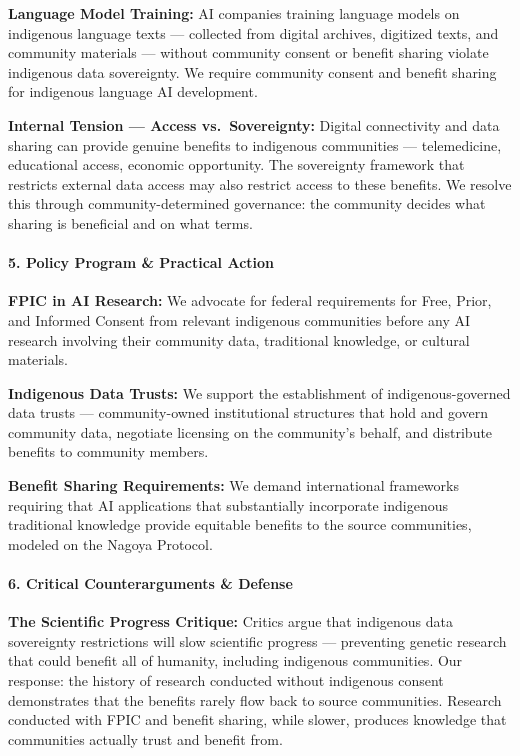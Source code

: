 \textbf{Language Model Training:} AI companies training language models
on indigenous language texts --- collected from digital archives,
digitized texts, and community materials --- without community consent
or benefit sharing violate indigenous data sovereignty. We require
community consent and benefit sharing for indigenous language AI
development.

\textbf{Internal Tension --- Access vs.~Sovereignty:} Digital
connectivity and data sharing can provide genuine benefits to indigenous
communities --- telemedicine, educational access, economic opportunity.
The sovereignty framework that restricts external data access may also
restrict access to these benefits. We resolve this through
community-determined governance: the community decides what sharing is
beneficial and on what terms.

\paragraph{5. Policy Program \& Practical
Action}\label{policy-program-practical-action-45}

\textbf{FPIC in AI Research:} We advocate for federal requirements for
Free, Prior, and Informed Consent from relevant indigenous communities
before any AI research involving their community data, traditional
knowledge, or cultural materials.

\textbf{Indigenous Data Trusts:} We support the establishment of
indigenous-governed data trusts --- community-owned institutional
structures that hold and govern community data, negotiate licensing on
the community's behalf, and distribute benefits to community members.

\textbf{Benefit Sharing Requirements:} We demand international
frameworks requiring that AI applications that substantially incorporate
indigenous traditional knowledge provide equitable benefits to the
source communities, modeled on the Nagoya Protocol.

\paragraph{6. Critical Counterarguments \&
Defense}\label{critical-counterarguments-defense-45}

\textbf{The Scientific Progress Critique:} Critics argue that indigenous
data sovereignty restrictions will slow scientific progress ---
preventing genetic research that could benefit all of humanity,
including indigenous communities. Our response: the history of research
conducted without indigenous consent demonstrates that the benefits
rarely flow back to source communities. Research conducted with FPIC and
benefit sharing, while slower, produces knowledge that communities
actually trust and benefit from.

